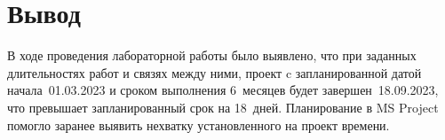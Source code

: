 \section{Вывод}

В ходе проведения лабораторной работы было выявлено, что при заданных
длительностях работ и связях между ними, проект c запланированной датой
начала~01.03.2023 и сроком выполнения 6~месяцев будет завершен~18.09.2023, что
превышает запланированный срок на 18~дней. Планирование в MS Project помогло
заранее выявить нехватку установленного на проект времени.
